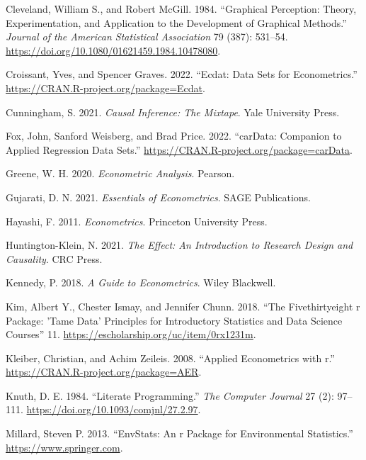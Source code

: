 \documentclass[
  letterpaper,
]{book}
\newlength{\cslhangindent}
\newenvironment{CSLReferences}[2] %
 {\begin{list}{}{%
  \setlength{\itemindent}{0pt}
  \setlength{\leftmargin}{0pt}
  \setlength{\parsep}{0pt}
  \ifodd #1
   \setlength{\leftmargin}{\cslhangindent}
   \setlength{\itemindent}{-1\cslhangindent}
  \fi
  \setlength{\itemsep}{#2\baselineskip}}}
 {\end{list}}
\begin{document}
\begin{CSLReferences}{1}{0}
Cleveland, William S., and Robert McGill. 1984. {``Graphical Perception:
Theory, Experimentation, and Application to the Development of Graphical
Methods.''} \emph{Journal of the American Statistical Association} 79
(387): 531--54. \url{https://doi.org/10.1080/01621459.1984.10478080}.

Croissant, Yves, and Spencer Graves. 2022. {``Ecdat: Data Sets for
Econometrics.''} \url{https://CRAN.R-project.org/package=Ecdat}.

Cunningham, S. 2021. \emph{Causal Inference: The Mixtape}. Yale
University Press.

Fox, John, Sanford Weisberg, and Brad Price. 2022. {``carData: Companion
to Applied Regression Data Sets.''}
\url{https://CRAN.R-project.org/package=carData}.

Greene, W. H. 2020. \emph{Econometric Analysis}. Pearson.

Gujarati, D. N. 2021. \emph{Essentials of Econometrics}. SAGE
Publications.

Hayashi, F. 2011. \emph{Econometrics}. Princeton University Press.

Huntington-Klein, N. 2021. \emph{The Effect: An Introduction to Research
Design and Causality}. CRC Press.

Kennedy, P. 2018. \emph{A Guide to Econometrics}. Wiley Blackwell.

Kim, Albert Y., Chester Ismay, and Jennifer Chunn. 2018. {``The
Fivethirtyeight r Package: 'Tame Data' Principles for Introductory
Statistics and Data Science Courses''} 11.
\url{https://escholarship.org/uc/item/0rx1231m}.

Kleiber, Christian, and Achim Zeileis. 2008. {``Applied Econometrics
with {\textbraceleft}r{\textbraceright}.''}
\url{https://CRAN.R-project.org/package=AER}.

Knuth, D. E. 1984. {``Literate Programming.''} \emph{The Computer
Journal} 27 (2): 97--111. \url{https://doi.org/10.1093/comjnl/27.2.97}.

Millard, Steven P. 2013. {``EnvStats: An r Package for Environmental
Statistics.''} \url{https://www.springer.com}.


\end{CSLReferences}
\end{document}
